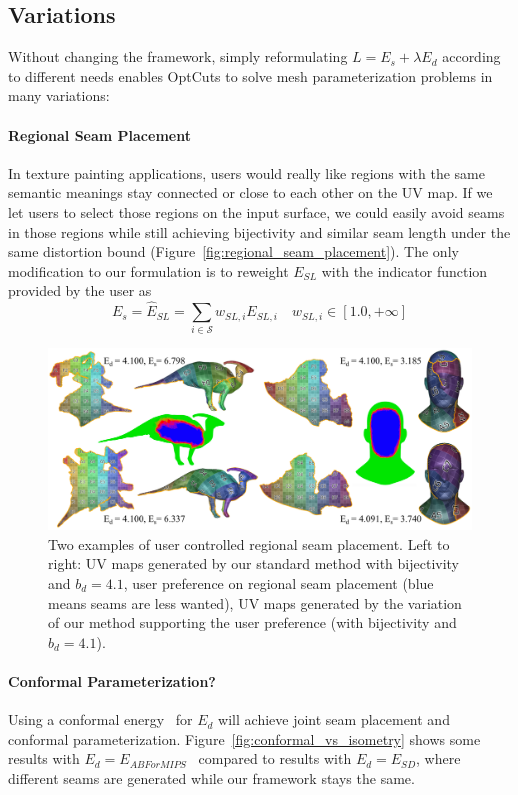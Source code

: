 \subsection{Variations}

Without changing the framework, simply reformulating $L = E_s + \lambda E_d$ according to different needs enables OptCuts to solve mesh parameterization problems in many variations:

\paragraph{Regional Seam Placement}
In texture painting applications, users would really like regions with the same semantic meanings stay connected or close to each other on the UV map. If we let users to select those regions on the input surface, we could easily avoid seams in those regions while still achieving bijectivity and similar seam length under the same distortion bound (Figure~\ref{fig:regional_seam_placement}). The only modification to our formulation is to reweight $E_{SL}$ with the indicator function provided by the user as
\[ E_s = \hat{E}_{SL} = \sum_{i\in\mathcal{S}} w_{SL,i} E_{SL,i} \quad w_{SL,i} \in [1.0, +\infty] \]


\begin{figure}[!h]
\centering
\includegraphics[width=\linewidth]{fig/regional_user.png}
\caption{Two examples of user controlled regional seam placement. Left to right: UV maps generated by our standard method with bijectivity and $b_d = 4.1$, user preference on regional seam placement (blue means seams are less wanted), UV maps generated by the variation of our method supporting the user preference (with bijectivity and $b_d = 4.1$). }
\label{fig:time_res_scalability}
\end{figure}

\paragraph{Conformal Parameterization?}
Using a conformal energy~\cite{Hormann2000MIPS,Sheffer2005ABFPP} for $E_d$ will achieve joint seam placement and conformal parameterization. Figure~\ref{fig:conformal_vs_isometry} shows some results with $E_d = E_{ABForMIPS}$~\cite{} compared to results with $E_d = E_{SD}$, where different seams are generated while our framework stays the same.

